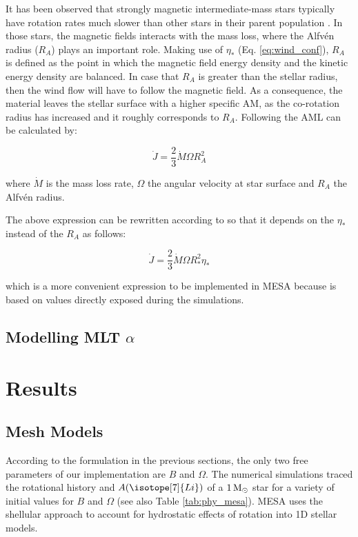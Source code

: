 \documentclass[fleqn,usenatbib]{mnras}
\begin{document}
It has been observed that strongly magnetic intermediate-mass stars typically have rotation rates much slower than other stars in their parent population \citep{Mathys2006}. In those stars, the magnetic fields interacts with the mass loss, where the Alfv\'{e}n radius ($R_{A}$) plays an important role. Making use of $\eta_*$ (Eq. \ref{eq:wind_conf}), $R_{A}$ is defined as the point in which the magnetic field energy density and the kinetic energy density are balanced. In case that $R_{A}$ is greater than the stellar radius, then the wind flow will have to follow the magnetic field. As a consequence, the material leaves the stellar surface with a higher specific AM, as the co-rotation radius has increased and it roughly corresponds to $R_{A}$. Following \citet{Weber1967} the AML can be calculated by:
\begin{ceqn}
\begin{equation}
 \Dot{J} = \frac{2}{3} \Dot{M}\Omega R^{2}_{A} \label{eq:j_dot}
\end{equation}
\end{ceqn}
where $\Dot{M}$ is the mass loss rate, $\Omega$ the angular velocity at star surface and $R_A$ the Alfv\'{e}n radius. \par

The above expression can be rewritten according to \citet{Ud-Doula2008} so that it depends on the $\eta_*$ instead of the $R_A$ as follows:
\begin{ceqn}
\begin{equation}
 \Dot{J} = \frac{2}{3} \Dot{M}\Omega R^{2}_{*}\eta_* \label{eq:j_dot_mesa}
\end{equation}
\end{ceqn}
which is a more convenient expression to be implemented in MESA because is based on values directly exposed during the simulations.

\subsection{Modelling MLT $\alpha$} \label{mod_mltalpha}

\section{Results} \label{sec_3}

\subsection{Mesh Models} \label{sec_mesh}
According to the formulation in the previous sections, the only two free parameters of our implementation are $B$ and $\Omega$. The numerical simulations traced the rotational history and $A(\isotope[7]{Li})$ of a $1\, \mathrm{M}_\odot$ star for a variety of initial values for $B$ and $\Omega$ (see also Table \ref{tab:phy_mesa}). MESA uses the shellular approach \citep{Meynet1997} to account for hydrostatic effects of rotation into 1D stellar models.\par
\end{document}
